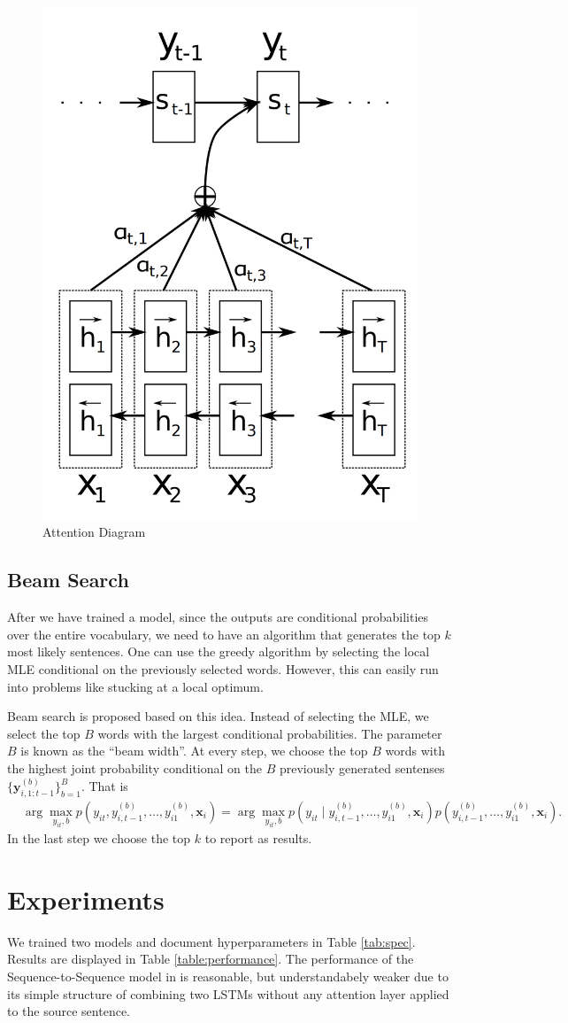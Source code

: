 \documentclass[12pt]{article}
\begin{document}
\begin{figure}
	\centering
	\includegraphics[width=0.3\linewidth]{figs/attn_diagram}
	\caption{Attention Diagram}
	\label{attn_diagram}
\end{figure}


\subsection{Beam Search}
\label{sub:beam}
After we have trained a model, since the outputs are conditional probabilities over the entire vocabulary, we need to have an algorithm that generates the top $k$ most likely sentences. One can use the greedy algorithm by selecting the local MLE conditional on the previously selected words. However, this can easily run into problems like stucking at a local optimum.

Beam search is proposed based on this idea. Instead of selecting the MLE, we select the top $B$ words with the largest conditional probabilities. The parameter $B$ is known as the ``beam width''. At every step, we choose the top $B$ words with the highest joint probability conditional on the $B$ previously generated sentenses $\{\bm y_{i, 1:t-1}^{(b)}\}_{b=1}^B$. That is
\begin{align}
	&\arg \max_{y_{it}, b} p(y_{it}, y_{i,t-1}^{(b)}, \dots, y_{i1}^{(b)}, \bm x_i)\nonumber = \arg \max_{y_{it}, b} p(y_{it} \mid y_{i,t-1}^{(b)}, \dots, y_{i1}^{(b)}, \bm x_i) p(y_{i,t-1}^{(b)}, \dots, y_{i1}^{(b)}, \bm x_i).
\end{align}
In the last step we choose the top $k$ to report as results.

\section{Experiments}
We trained two models and document hyperparameters in Table \ref{tab:spec}. Results are displayed in Table \ref{table:performance}. The performance of the Sequence-to-Sequence model in \cite{sutskever2014sequence} is reasonable, but understandabely weaker due to its simple structure of combining two LSTMs without any attention layer applied to the source sentence.
\end{document}
